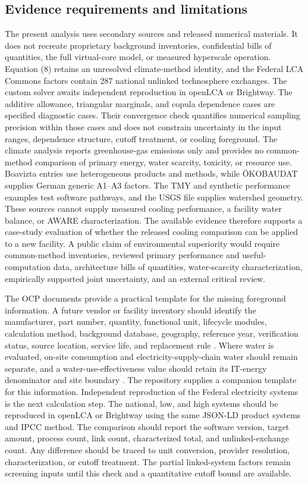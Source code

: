 \documentclass[review,a4paper,fleqn]{cas-sc}
\begin{document}
\subsection{Evidence requirements and limitations}
The present analysis uses secondary sources and released numerical materials. It does not recreate proprietary background inventories, confidential bills of quantities, the full virtual-core model, or measured hyperscale operation. Equation (8) retains an unresolved climate-method identity, and the Federal LCA Commons factors contain 287 national unlinked technosphere exchanges. The custom solver awaits independent reproduction in openLCA or Brightway. The additive allowance, triangular marginals, and copula dependence cases are specified diagnostic cases. Their convergence check quantifies numerical sampling precision within those cases and does not constrain uncertainty in the input ranges, dependence structure, cutoff treatment, or cooling foreground. The climate analysis reports greenhouse-gas emissions only and provides no common-method comparison of primary energy, water scarcity, toxicity, or resource use. Boavizta entries use heterogeneous products and methods, while ÖKOBAUDAT supplies German generic A1--A3 factors. The TMY and synthetic performance examples test software pathways, and the USGS file supplies watershed geometry. These sources cannot supply measured cooling performance, a facility water balance, or AWARE characterization. The available evidence therefore supports a case-study evaluation of whether the released cooling comparison can be applied to a new facility. A public claim of environmental superiority would require common-method inventories, reviewed primary performance and useful-computation data, architecture bills of quantities, water-scarcity characterization, empirically supported joint uncertainty, and an external critical review.

The OCP documents provide a practical template for the missing foreground information. A future vendor or facility inventory should identify the manufacturer, part number, quantity, functional unit, lifecycle modules, calculation method, background database, geography, reference year, verification status, source location, service life, and replacement rule \cite{ref51}. Where water is evaluated, on-site consumption and electricity-supply-chain water should remain separate, and a water-use-effectiveness value should retain its IT-energy denominator and site boundary \cite{ref52}. The repository supplies a companion template for this information. Independent reproduction of the Federal electricity systems is the next calculation step. The national, low, and high systems should be reproduced in openLCA or Brightway using the same JSON-LD product systems and IPCC method. The comparison should report the software version, target amount, process count, link count, characterized total, and unlinked-exchange count. Any difference should be traced to unit conversion, provider resolution, characterization, or cutoff treatment. The partial linked-system factors remain screening inputs until this check and a quantitative cutoff bound are available.
\end{document}
